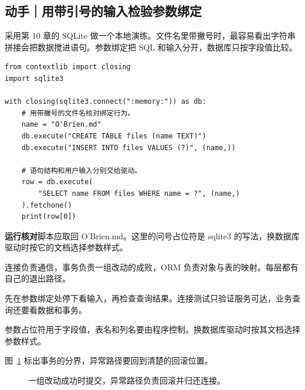 \documentclass[UTF8,a4paper,oneside,openany,fontset=none,11pt]{ctexbook}
\newcommand{\code}[1]{\texttt{\detokenize{#1}}}
\begin{document}
\subsection*{动手｜用带引号的输入检验参数绑定}

采用第 10 章的 SQLite 做一个本地演练。文件名里带撇号时，最容易看出字符串拼接会把数据搅进语句。参数绑定把 SQL 和输入分开，数据库只按字段值比较。

\begin{lstlisting}[title={\code{bind_query.py}}]
from contextlib import closing
import sqlite3

with closing(sqlite3.connect(":memory:")) as db:
    # 用带撇号的文件名核对绑定行为。
    name = "O'Brien.md"
    db.execute("CREATE TABLE files (name TEXT)")
    db.execute("INSERT INTO files VALUES (?)", (name,))

    # 语句结构和用户输入分别交给驱动。
    row = db.execute(
        "SELECT name FROM files WHERE name = ?", (name,)
    ).fetchone()
    print(row[0])
\end{lstlisting}

\textbf{运行核对}\enspace 脚本应取回 O'Brien.md。这里的问号占位符是 sqlite3 的写法，换数据库驱动时按它的文档选择参数样式。

\begin{myunderstanding}
连接负责通信，事务负责一组改动的成败，ORM 负责对象与表的映射。每层都有自己的退出路径。
\end{myunderstanding}

\begin{pycharmpractice}
先在参数绑定处停下看输入，再检查查询结果。连接测试只验证服务可达，业务查询还要看数据和事务。
\end{pycharmpractice}

\begin{pitfall}
参数占位符用于字段值，表名和列名要由程序控制。换数据库驱动时按其文档选择参数样式。
\end{pitfall}
图~\ref{fig:chapter-14-flow} 标出事务的分界，异常路径要回到清楚的回滚位置。
\begin{figure}[htbp]
  \centering
  \caption{一组改动成功时提交，异常路径负责回滚并归还连接。}
  \label{fig:chapter-14-flow}
\end{figure}
\end{document}
